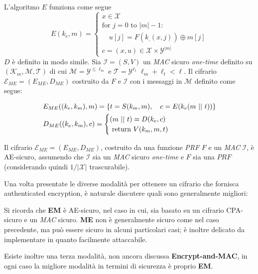 L'algoritmo $E$ funziona come segue 
\[
    E(k_e,m) = 
    \begin{cases}
        x \in \mathcal{X}\\
        \text{for } j = 0 \text{ to } |m| -1:\\
        \quad u[j] = F(k_, (x,j)) \oplus m[j]\\
        c = (x,u) \in \mathcal{X} \times \mathcal{Y}^{|m|}
    \end{cases}
\]
$D$ è definito in modo simile. Sia $\mathcal{I} = (S,V)$ un \emph{MAC} sicuro \emph{one-time} definito su $(\mathcal{K}_m, \mathcal{M},\mathcal{T})$ di cui $\mathcal{M} = \mathcal{Y}^{\leq \ell_m}$ e $\mathcal{T} = \mathcal{Y}^{\ell_t}$ $\ell_m + \ell_t < \ell$. Il cifrario $\mathcal{E}_{ME} = (E_{ME},D_{ME})$ costruito da $F$ e $\mathcal{I}$ con i messaggi in $\mathcal{M}$ definito come segue:

\begin{align*}
    &E_{ME}( (k_e,k_m),m) = \{ t = S(k_m,m), \quad c = E(k_e (m \operatorname{\,||\,} t))\} \\
    &D_{ME}( (k_e,k_m),c) = \begin{cases}
        (m \operatorname{\,||\,} t) = D(k_e,c)\\
        \text{ return } V(k_m,m,t)
    \end{cases}\\
\end{align*}

\begin{theorem}
    Il cifrario $\mathcal{E}_{ME} = (E_{ME},D_{ME})$, costruito da una funzione \emph{PRF} $F$ e un \emph{MAC} $\mathcal{I}$, è AE-sicuro, assumendo che $\mathcal{I}$ sia un \emph{MAC} sicuro \emph{one-time} e $F$ sia una $PRF$ (considerando quindi $1/|\mathcal{X}|$ trascurabile).
\end{theorem}

\vspace{1em}\noindent
Una volta presentate le diverse modalità per ottenere un cifrario che fornisca authenticated encryption, è naturale discutere quali sono generalmente migliori:

Si ricorda che \textbf{EM} è AE-sicuro, nel caso in cui, sia basato su un cifrario CPA-sicuro e un \emph{MAC} sicuro. \textbf{ME} non è generalmente sicuro come nel caso precedente, ma può essere sicuro in alcuni particolari casi; è inoltre delicato da implementare in quanto facilmente attaccabile.

Esiste inoltre una terza modalità, non ancora discussa \textbf{Encrypt-and-MAC}, in ogni caso la migliore modalità in termini di sicurezza è proprio \textbf{EM}.

